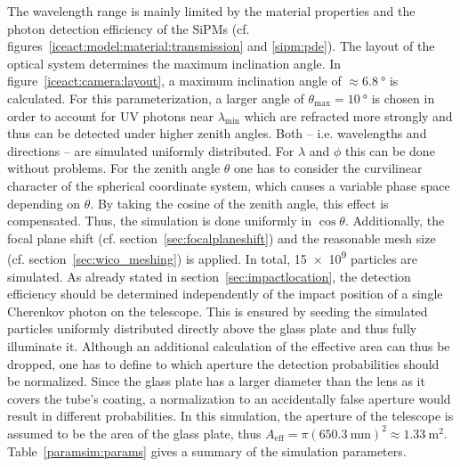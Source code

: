 The wavelength range is mainly limited by the material properties and the photon detection efficiency of the SiPMs (cf. figures~\ref{iceact:model:material:transmission} and \ref{sipm:pde}). The layout of the optical system determines the maximum inclination angle. In figure~\ref{iceact:camera:layout}, a maximum inclination angle of $\approx\SI{6.8}{\degree}$ is calculated. For this parameterization, a larger angle of $\theta_\text{max}=\SI{10}{\degree}$ is chosen in order to account for UV photons near $\lambda_\text{min}$  which are refracted more strongly and thus can be detected under higher zenith angles. Both -- i.e. wavelengths and directions -- are simulated uniformly distributed. For $\lambda$ and $\phi$ this can be done without problems. For the zenith angle $\theta$ one has to consider the curvilinear character of the spherical coordinate system, which causes a variable phase space depending on $\theta$. By taking the cosine of the zenith angle, this effect is compensated. Thus, the simulation is done uniformly in $\cos{\theta}$. Additionally, the focal plane shift (cf. section~\ref{sec:focalplaneshift}) and the reasonable mesh size (cf. section~\ref{sec:wico_meshing}) is applied. In total, \num{15e9} particles are simulated. As already stated in section~\ref{sec:impactlocation}, the detection efficiency should be determined independently of the impact position of a single Cherenkov photon on the telescope. This is ensured by seeding the simulated particles uniformly distributed directly above the glass plate and thus fully illuminate it. Although an additional calculation of the effective area can thus be dropped, one has to define to which aperture the detection probabilities should be normalized. Since the glass plate has a larger diameter than the lens as it covers the tube's coating, a normalization to an accidentally false aperture would result in different probabilities. In this simulation, the aperture of the telescope is assumed to be the area of the glass plate, thus $A_\text{eff} = \pi(\SI{650.3}{\milli\meter})^2\approx\SI{1.33}{\meter\squared}$.
Table~\ref{paramsim:params} gives a summary of the simulation parameters.

